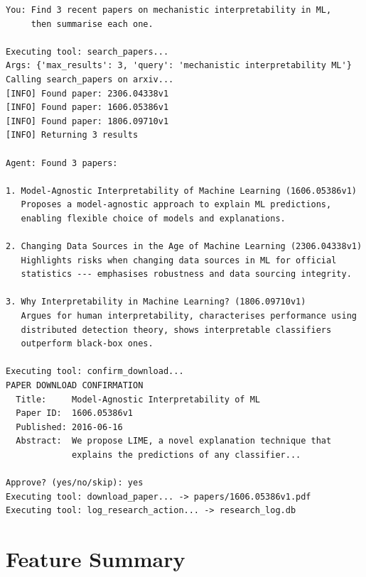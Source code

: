 \documentclass[12pt, a4paper]{article}
\begin{document}
\begin{lstlisting}[style=terminal, caption={Live agent session searching for interpretability papers}]
You: Find 3 recent papers on mechanistic interpretability in ML,
     then summarise each one.

Executing tool: search_papers...
Args: {'max_results': 3, 'query': 'mechanistic interpretability ML'}
Calling search_papers on arxiv...
[INFO] Found paper: 2306.04338v1
[INFO] Found paper: 1606.05386v1
[INFO] Found paper: 1806.09710v1
[INFO] Returning 3 results

Agent: Found 3 papers:

1. Model-Agnostic Interpretability of Machine Learning (1606.05386v1)
   Proposes a model-agnostic approach to explain ML predictions,
   enabling flexible choice of models and explanations.

2. Changing Data Sources in the Age of Machine Learning (2306.04338v1)
   Highlights risks when changing data sources in ML for official
   statistics --- emphasises robustness and data sourcing integrity.

3. Why Interpretability in Machine Learning? (1806.09710v1)
   Argues for human interpretability, characterises performance using
   distributed detection theory, shows interpretable classifiers
   outperform black-box ones.

Executing tool: confirm_download...
PAPER DOWNLOAD CONFIRMATION
  Title:     Model-Agnostic Interpretability of ML
  Paper ID:  1606.05386v1
  Published: 2016-06-16
  Abstract:  We propose LIME, a novel explanation technique that
             explains the predictions of any classifier...

Approve? (yes/no/skip): yes
Executing tool: download_paper... -> papers/1606.05386v1.pdf
Executing tool: log_research_action... -> research_log.db
\end{lstlisting}

\section{Feature Summary}
\end{document}
